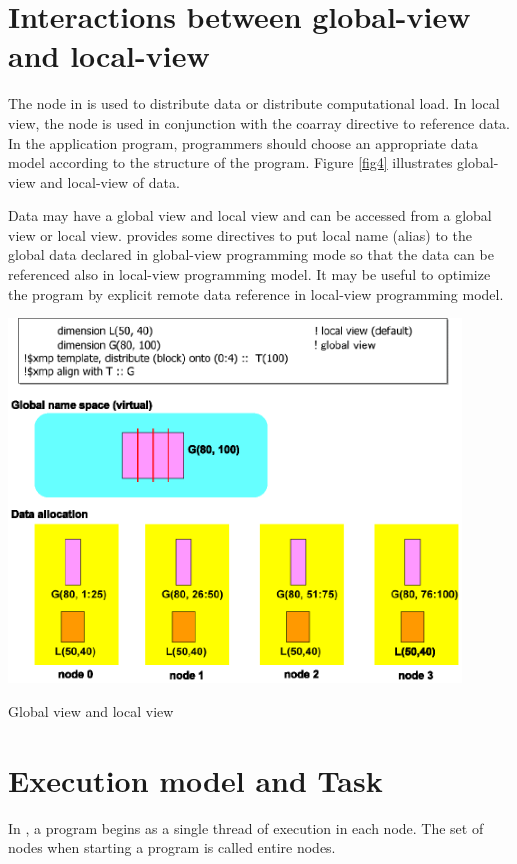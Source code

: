 \section{Interactions between global-view and local-view}

The node in
\XMP is used to distribute data or distribute computational
load. In local view, the node is used in conjunction with the coarray
directive to reference data. In the application program, programmers
should choose an appropriate data model according to the structure of
the program. Figure \ref{fig4} illustrates global-view and
local-view of data.

Data may have a global view and local view and can be
accessed from a global view or local view. \XMP provides some
directives to put local name (alias) to the global data declared in
global-view programming mode so that the data can be referenced also
in local-view programming model. It may be useful to optimize the
program by explicit remote data reference in local-view programming
model.

\begin{myfigure}
\includegraphics[width=12cm]{figs/Fig4.eps}
  \caption{Global view and local view}
\label{fig4}
\end{myfigure}

\section{Execution model and Task}


In \XMP, a program begins as a single thread
of execution in each node. The set of nodes when starting a program is
called entire nodes.

